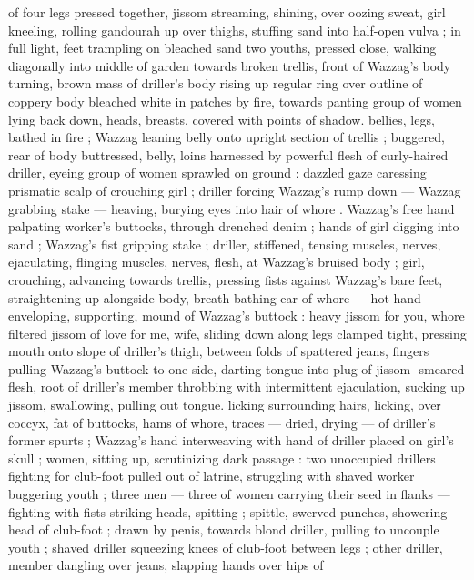 of four legs pressed together, jissom streaming, shining, over oozing 
sweat, girl kneeling, rolling gandourah up over thighs, stuffing sand 
into half-open vulva ; in full light, feet trampling on bleached sand 
two youths, pressed close, walking diagonally into middle of garden 
towards broken trellis, front of Wazzag's body turning, brown mass 
of driller's body rising up regular ring over outline of coppery body 
bleached white in patches by fire, towards panting group of women 
lying back down, heads, breasts, covered with points of shadow. 
bellies, legs, bathed in fire ; Wazzag leaning belly onto upright 
section of trellis ; buggered, rear of body buttressed, belly, loins 
harnessed by powerful flesh of curly-haired driller, eyeing group of 
women sprawled on ground : dazzled gaze caressing prismatic scalp 
of crouching girl ; driller forcing Wazzag's rump down --- Wazzag 
grabbing stake --- heaving, burying eyes into hair of whore . 
Wazzag's free hand palpating worker's buttocks, through drenched 
denim ; hands of girl digging into sand ; Wazzag's fist gripping stake 
; driller, stiffened, tensing muscles, nerves, ejaculating, flinging 
muscles, nerves, flesh, at Wazzag's bruised body ; girl, crouching, 
advancing towards trellis, pressing fists against Wazzag's bare feet, 
straightening up alongside body, breath bathing ear of whore --- hot 
hand enveloping, supporting, mound of Wazzag's buttock : {\gl}{\thd} heavy 
jissom for you, whore{\thd} filtered jissom of love for me, wife{\thd}{\gr}, sliding 
down along legs clamped tight, pressing mouth onto slope of 
driller's thigh, between folds of spattered jeans, fingers pulling 
Wazzag's buttock to one side, darting tongue into plug of jissom- 
smeared flesh, root of driller's member throbbing with intermittent 
ejaculation, sucking up jissom, swallowing, pulling out tongue. licking 
surrounding hairs, licking, over coccyx, fat of buttocks, hams of 
whore, traces --- dried, drying --- of driller's former spurts ; 
Wazzag's hand interweaving with hand of driller placed on girl's skull 
; women, sitting up, scrutinizing dark passage : two unoccupied 
drillers fighting for club-foot pulled out of latrine, struggling with 
shaved worker buggering youth ; three men --- three of women 
carrying their seed in flanks --- fighting with fists striking heads, 
spitting ; spittle, swerved punches, showering head of club-foot ; 
drawn by penis, towards blond driller, pulling to uncouple youth ; 
shaved driller squeezing knees of club-foot between legs ; other 
driller, member dangling over jeans, slapping hands over hips of 
